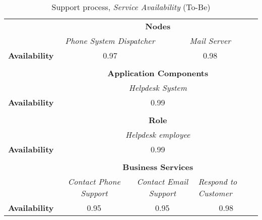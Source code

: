 \begin{table}[H]
	\centering
	\begin{tabular}{|c|c|p{2.5cm}|p{2.5cm}|p{2.5cm}|p{2.5cm}|}

		\cline{3-6}

		\multicolumn{2}{c}{} & \multicolumn{4}{|c|}{\textbf{Nodes}} \\ \cline{3-6}
		\multicolumn{2}{c|}{} & \multicolumn{2}{|c|}{\textsl{Phone System Dispatcher}} & \multicolumn{2}{|c|}{\textsl{Mail Server}}\\ \hline
		\multicolumn{2}{|c|}{\textbf{Availability}} & \multicolumn{2}{|c|}{0.97} & \multicolumn{2}{|c|}{0.98} \\  \hline

		\multicolumn{6}{c}{} \\ \cline{3-6}							
		\multicolumn{2}{c}{} & \multicolumn{4}{|c|}{\textbf{Application Components}} \\ \cline{3-6}
		\multicolumn{2}{c|}{} & \multicolumn{4}{c|}{\textsl{Helpdesk System}} \\
		\hline
		\multicolumn{2}{|c|}{\textbf{Availability}} & \multicolumn{4}{c|}{0.99} \\ \hline

	   \multicolumn{6}{c}{} \\ \cline{3-6}
		\multicolumn{2}{c}{} & \multicolumn{4}{|c|}{\textbf{Role}} \\ \cline{3-6}
		\multicolumn{2}{c|}{} & \multicolumn{4}{|c|}{\textsl{Helpdesk employee}}\\ \hline
		\multicolumn{2}{|c|}{\textbf{Availability}}& \multicolumn{4}{|c|}{0.99} \\  \hline
		
		\multicolumn{6}{c}{} \\ \cline{3-6}
		\multicolumn{2}{c}{} & \multicolumn{4}{|c|}{\textbf{Business Services}} \\ \cline{3-6}
		\multicolumn{2}{c|}{} & \multicolumn{1}{|c|}{\textsl{Contact Phone Support}} & \multicolumn{2}{|c|}{\textsl{Contact Email Support}} & \multicolumn{1}{|p{2cm}|}{\textsl{Respond to Customer}}\\ \hline
		\multicolumn{2}{|c|}{\textbf{Availability}}& \multicolumn{1}{|c|}{0.95} & \multicolumn{2}{|c|}{0.95} & \multicolumn{1}{|c|}{0.98}\\ \hline
	\end{tabular}
\caption{Support process, \textsl{Service Availability} (To-Be)} 
\label{tab:support_to_be}
\end{table}